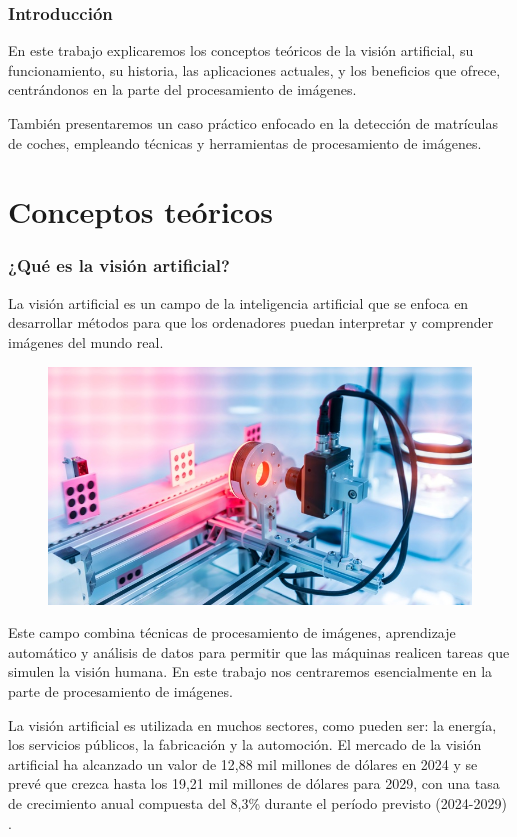 \section{Introducción}
En este trabajo explicaremos los conceptos teóricos de la visión artificial, su funcionamiento, su historia, las aplicaciones actuales, y los beneficios que ofrece, centrándonos en la parte del procesamiento de imágenes. 

También presentaremos un caso práctico enfocado en la detección de matrículas de coches, empleando técnicas y herramientas de procesamiento de imágenes.

\part{Conceptos teóricos}

\section{¿Qué es la visión artificial?}
La visión artificial es un campo de la inteligencia artificial que se enfoca en desarrollar métodos para que los ordenadores puedan interpretar y comprender imágenes del mundo real.

\begin{figure}[H]
    \centering
    \includegraphics[width=0.5\linewidth]{Images/vision_artificial.jpg}
\end{figure}

Este campo combina técnicas de procesamiento de imágenes, aprendizaje automático y análisis de datos para permitir que las máquinas realicen tareas que simulen la visión humana. En este trabajo nos centraremos esencialmente en la parte de procesamiento de imágenes.

La visión artificial es utilizada en muchos sectores, como pueden ser: la energía, los servicios públicos, la fabricación y la automoción. El mercado de la visión artificial ha alcanzado un valor de 12,88 mil millones de dólares en 2024 y se prevé que crezca hasta los 19,21 mil millones de dólares para 2029, con una tasa de crecimiento anual compuesta del 8,3\% durante el período previsto (2024-2029) \cite{mercado}.



